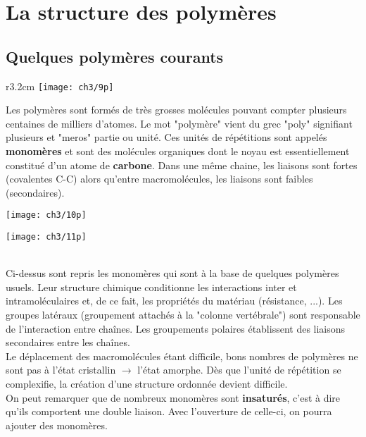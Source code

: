 \section{La structure des polymères}
	\subsection{Quelques polymères courants}
		\begin{wrapfigure}[2]{r}{3.2cm}
		\vspace{-5mm}
		\texttt{[image: ch3/9p]}
		\end{wrapfigure}	
		Les polymères sont formés de très grosses molécules pouvant compter plusieurs centaines de milliers d'atomes. Le mot "polymère" vient du grec "poly" signifiant plusieurs et "meros" partie ou unité. Ces unités de répétitions sont appelés \textbf{monomères} et sont des molécules organiques dont le noyau est essentiellement constitué d'un atome de \textbf{carbone}. Dans une même chaine, les liaisons sont fortes (covalentes C-C) alors qu'entre macromolécules, les liaisons sont faibles (secondaires).\\
		
		\begin{minipage}{0.5 \textwidth}
			\begin{flushleft}
				\texttt{[image: ch3/10p]}
			\end{flushleft}
		\end{minipage}
		\begin{minipage}{0.5 \textwidth}
			\begin{flushright}
				\texttt{[image: ch3/11p]}
			\end{flushright}
		\end{minipage}
		\ \\
		Ci-dessus sont repris les monomères qui sont à la base de quelques polymères usuels. Leur structure chimique conditionne les interactions inter et intramoléculaires et, de ce fait, les propriétés du matériau (résistance, ...). Les groupes latéraux (groupement attachés à la "colonne vertébrale") sont responsable de l'interaction entre chaînes. Les groupements polaires établissent des liaisons secondaires entre les chaînes. \\
		Le déplacement des macromolécules étant difficile, bons nombres de polymères ne sont pas à l'état cristallin $\rightarrow$ l'état amorphe. Dès que l'unité de répétition se complexifie, la création d'une structure ordonnée devient difficile. \\
		On peut remarquer que de nombreux monomères sont \textbf{insaturés}, c'est à dire qu'ils comportent une double liaison. Avec l'ouverture de celle-ci, on pourra ajouter des monomères.
		
